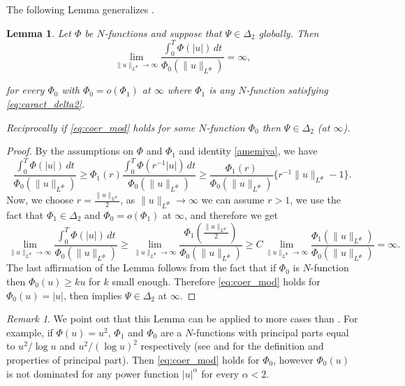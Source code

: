 \documentclass[twoside]{article}
\newtheorem{lem}[thm]{Lemma}
\theoremstyle{remark}
\newtheorem{comentario}{Remark}
\newcommand{\orlnor}{\|_{L^{\Phi}}}
\renewcommand{\geq}{\geqslant}
\begin{document}
The following Lemma generalizes \cite[Lemma 5.2]{ABGMS2015}.

\begin{lem}\label{lem_coer}
Let $\Phi$ be $N$-functions and suppose that $\Psi \in \Delta_2$ globally. Then
\begin{equation}\label{eq:coer_mod}
\lim\limits_{\|u\orlnor\to \infty}
\frac{\int_0^T \Phi(|u|)\,dt}{\Phi_0(\|u\orlnor)}=\infty,
\end{equation}


for every $\Phi_0$ with $\Phi_0=o(\Phi_1)$ at $\infty$ where $\Phi_1$ is any $N$-function satisfying \eqref{eq:caract_delta2}.

Reciprocally if  \eqref{eq:coer_mod} holds for some $N$-function $\Phi_0$ then $\Psi\in\Delta_2$ (at $\infty$). 
\end{lem}

\begin{proof}
By the assumptions on $\Phi$ and $\Phi_1$  and identity \eqref{amemiya}, we have
\[
\frac{\int_0^T \Phi(|u|)\,dt}{\Phi_0(\|u\orlnor)}\geq
\Phi_1(r) \frac{\int_0^T \Phi(r^{-1}|u|)\,dt}{\Phi_0(\|u\orlnor)}\geq
\frac{\Phi_1(r)}{\Phi_0(\|u\orlnor)}\{r^{-1}\|u\orlnor-1\}.
\]
Now, we choose $r=\frac{\|u\orlnor}{2}$, as $\|u\orlnor\to\infty$ we can assume $r>1$, we use the fact that $\Phi_1\in\Delta_2$ and
$\Phi_0=o(\Phi_1)$ at $\infty$, and 
therefore we get
\[
\lim\limits_{\|u\orlnor \to \infty} \frac{\int_0^T \Phi(|u|)\,dt}{\Phi_0(\|u\orlnor)}\geq
\lim\limits_{\|u\orlnor \to \infty} \frac{\Phi_1\left(\frac{\|u\orlnor}{2}\right)}{\Phi_0(\|u\orlnor)}
\geq
C \lim\limits_{\|u\orlnor \to \infty} \frac{\Phi_1(\|u\orlnor)}{\Phi_0(\|u\orlnor)}=\infty.
\]
The last affirmation of the Lemma follows from the fact that if $\Phi_0$ is $N$-function then $\Phi_0(u)\geq ku$ for  $k$ small enough. Therefore \eqref{eq:coer_mod} holds for $\Phi_0(u)=|u|$, then \cite[Lemma 5.2]{ABGMS2015}  implies  $\Psi\in\Delta_2$ at $\infty$.

\end{proof}


\begin{comentario}  We point out that this Lemma can be applied to more cases than \cite[Lemma 5.2]{ABGMS2015}. For example, if $\Phi(u)=u^2$, $\Phi_1$ and $\Phi_0$ are a $N$-functions with principal parts equal to $u^2/\log u$ and $u^2/(\log u)^2$ respectively (see \cite[p. 16]{KR} and \cite[Section 7]{KR} for the definition and properties of principal part). Then  \eqref{eq:coer_mod} holds for $\Phi_0$, however $\Phi_0(u)$ is not dominated for any  power function $|u|^{\alpha}$ for every $\alpha<2$. 
\end{comentario}
\end{document}
